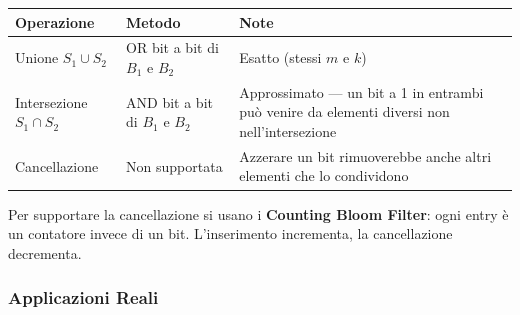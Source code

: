 \documentclass[
  italian,
  openany]{book}
\newcounter{none} %
\begin{document}
{\def\LTcaptype{none} %
\begin{longtable}[]{@{}
  >{\raggedright\arraybackslash}p{}
  >{\raggedright\arraybackslash}p{}
  >{\raggedright\arraybackslash}p{}@{}}
\toprule\noalign{}
\begin{minipage}[b]{\linewidth}\raggedright
Operazione
\end{minipage} & \begin{minipage}[b]{\linewidth}\raggedright
Metodo
\end{minipage} & \begin{minipage}[b]{\linewidth}\raggedright
Note
\end{minipage} \\
\midrule\noalign{}
\endhead
\bottomrule\noalign{}
\endlastfoot
Unione \(S_1 \cup S_2\) & OR bit a bit di \(B_1\) e \(B_2\) & Esatto
(stessi \(m\) e \(k\)) \\
Intersezione \(S_1 \cap S_2\) & AND bit a bit di \(B_1\) e \(B_2\) &
Approssimato --- un bit a 1 in entrambi può venire da elementi diversi
non nell'intersezione \\
Cancellazione & Non supportata & Azzerare un bit rimuoverebbe anche
altri elementi che lo condividono \\
\end{longtable}
}

Per supportare la cancellazione si usano i \textbf{Counting Bloom
Filter}: ogni entry è un contatore invece di un bit. L'inserimento
incrementa, la cancellazione decrementa.

\subsubsection{Applicazioni Reali}\label{applicazioni-reali}
\end{document}
